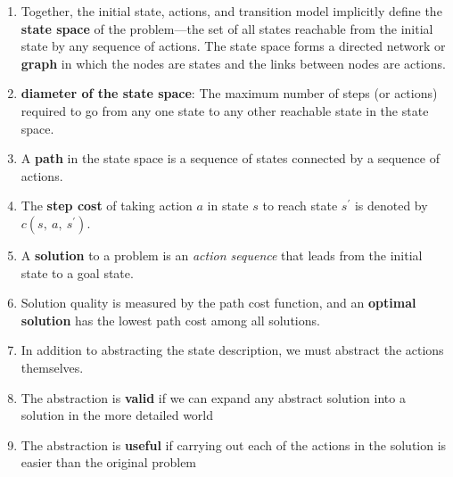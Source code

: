 \begin{enumerate}[itemsep=0.2cm]
    \item Together, the initial state, actions, and transition model implicitly define the \textbf{state space} of the problem—the set of all states reachable from the initial state by any sequence of actions. The state space forms a directed network or \textbf{graph} in which the nodes are states and the links between nodes are actions.
    \hfill \cite{ai/book/Artificial-Intelligence-A-Modern-Approach/Russell-Norvig}

    \item \textbf{diameter of the state space}: The maximum number of steps (or actions) required to go from any one state to any other reachable state in the state space.
    \hfill \cite{ai/book/Artificial-Intelligence-A-Modern-Approach/Russell-Norvig}

    \item A \textbf{path} in the state space is a sequence of states connected by a sequence of actions.
    \hfill \cite{ai/book/Artificial-Intelligence-A-Modern-Approach/Russell-Norvig}

    \item The \textbf{step cost} of taking action $a$ in state $s$ to reach state $s^\prime$ is denoted by $c(s,\ a,\ s^\prime)$.
    \hfill \cite{ai/book/Artificial-Intelligence-A-Modern-Approach/Russell-Norvig}

    \item A \textbf{solution} to a problem is an \textit{action sequence} that leads from the initial state to a goal state. 
    \hfill \cite{ai/book/Artificial-Intelligence-A-Modern-Approach/Russell-Norvig}
    
    \item Solution quality is measured by the path cost function, and an \textbf{optimal solution} has the lowest path cost among all solutions.
    \hfill \cite{ai/book/Artificial-Intelligence-A-Modern-Approach/Russell-Norvig}

    \item In addition to abstracting the state description, we must abstract the actions themselves.
    \hfill \cite{ai/book/Artificial-Intelligence-A-Modern-Approach/Russell-Norvig}

    \item The abstraction is \textbf{valid} if we can expand any abstract solution into a solution in the more detailed world
    \hfill \cite{ai/book/Artificial-Intelligence-A-Modern-Approach/Russell-Norvig}

    \item The abstraction is \textbf{useful} if carrying out each of the actions in the solution is easier than the original problem
    \hfill \cite{ai/book/Artificial-Intelligence-A-Modern-Approach/Russell-Norvig}
\end{enumerate}

